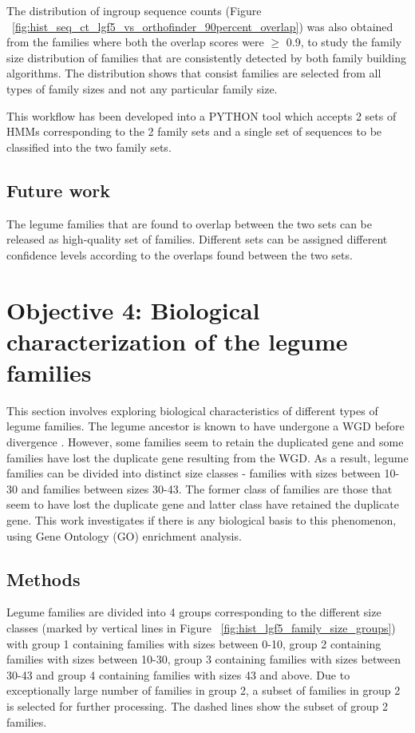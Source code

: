 \documentclass{article}
\begin{document}
		The distribution of ingroup sequence counts (Figure ~\ref{fig:hist_seq_ct_lgf5_vs_orthofinder_90percent_overlap}) was also obtained from the families where both the overlap scores were $\geq$ 0.9, to study the family size distribution of families that are consistently detected by both family building algorithms. The distribution shows that consist families are selected from all types of family sizes and not any particular family size.
				
		This workflow has been developed into a PYTHON tool which accepts 2 sets of HMMs corresponding to the 2 family sets and a single set of sequences to be classified into the two family sets.
		
		\subsection{Future work}
		The legume families that are found to overlap between the two sets can be released as high-quality set of families. Different sets can be assigned different confidence levels according to the overlaps found between the two sets.
	
	\clearpage
	\section{Objective 4: Biological characterization of the legume families}
	This section involves exploring biological characteristics of different types of legume families. The legume ancestor is known to have undergone a WGD before divergence \citep{cannon2014multiple}.  However, some families seem to retain the duplicated gene and some families have lost the duplicate gene resulting from the WGD. As a result, legume families can be divided into distinct size classes - families with sizes between 10-30 and families between sizes 30-43. The former class of families are those that seem to have lost the duplicate gene and latter class have retained the duplicate gene. This work investigates if there is any biological basis to this phenomenon, using Gene Ontology (GO) enrichment analysis. 
	
		\subsection{Methods}
		Legume families are divided into 4 groups corresponding to the different size classes (marked by vertical lines in Figure ~\ref{fig:hist_lgf5_family_size_groups}) with group 1 containing families with sizes between 0-10, group 2 containing families with sizes between 10-30, group 3 containing families with sizes between 30-43 and group 4 containing families with sizes 43 and above. Due to exceptionally large number of families in group 2, a subset of families in group 2 is selected for further processing. The dashed lines show the subset of group 2 families.
		
\end{document}
